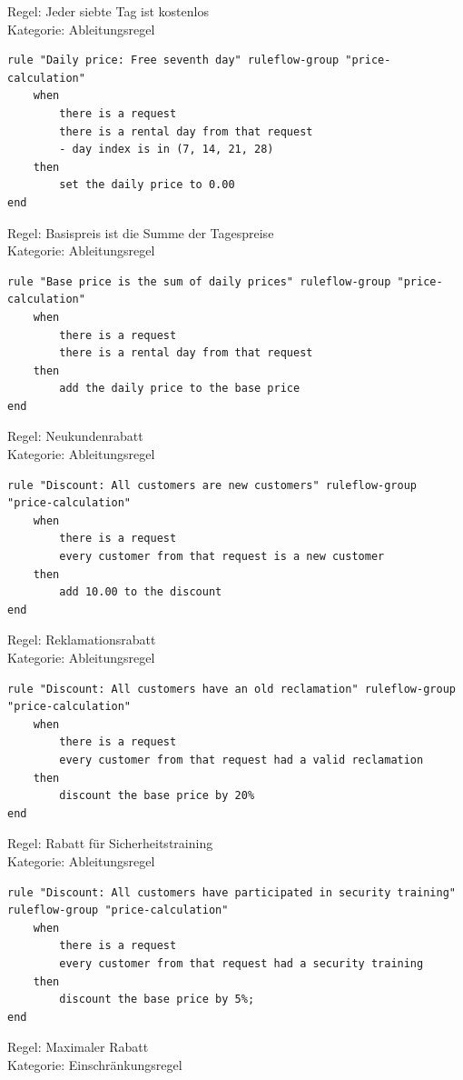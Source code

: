 Regel: Jeder siebte Tag ist kostenlos \\
Kategorie: Ableitungsregel

\begin{lstlisting}
rule "Daily price: Free seventh day" ruleflow-group "price-calculation"
	when
		there is a request
		there is a rental day from that request
		- day index is in (7, 14, 21, 28)
	then
		set the daily price to 0.00
end
\end{lstlisting}

Regel: Basispreis ist die Summe der Tagespreise \\
Kategorie: Ableitungsregel

\begin{lstlisting}
rule "Base price is the sum of daily prices" ruleflow-group "price-calculation"
	when
		there is a request
		there is a rental day from that request
	then
		add the daily price to the base price
end
\end{lstlisting}

Regel: Neukundenrabatt \\
Kategorie: Ableitungsregel

\begin{lstlisting}
rule "Discount: All customers are new customers" ruleflow-group "price-calculation"
	when
		there is a request
		every customer from that request is a new customer
	then
		add 10.00 to the discount
end
\end{lstlisting}

Regel: Reklamationsrabatt \\
Kategorie: Ableitungsregel

\begin{lstlisting}
rule "Discount: All customers have an old reclamation" ruleflow-group "price-calculation"
	when
		there is a request
		every customer from that request had a valid reclamation
	then
		discount the base price by 20%
end
\end{lstlisting}

Regel: Rabatt für Sicherheitstraining \\
Kategorie: Ableitungsregel

\begin{lstlisting}
rule "Discount: All customers have participated in security training" ruleflow-group "price-calculation"
	when
		there is a request
		every customer from that request had a security training
	then
		discount the base price by 5%;
end
\end{lstlisting}

Regel: Maximaler Rabatt \\
Kategorie: Einschränkungsregel

